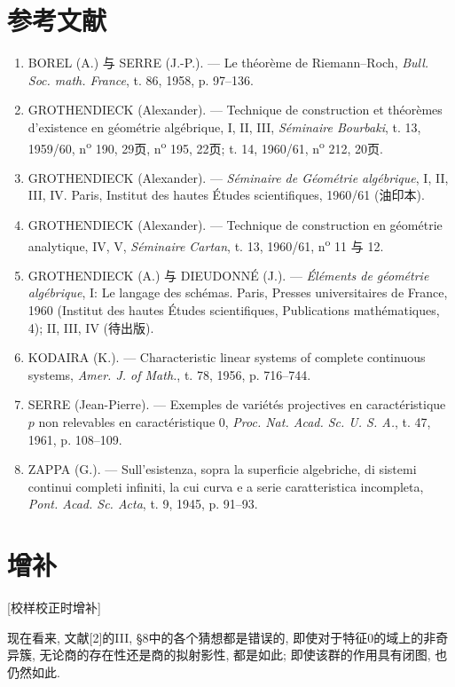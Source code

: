 \section*{参考文献}

\begin{enumerate}
\item[{[1]}]\label{fga3.iv-bib-1} BOREL (A.) 与 SERRE (J.-P.). --- Le théorème de Riemann--Roch, \emph{Bull. Soc. math. France}, t. 86, 1958, p. 97--136.
\item[{[2]}]\label{fga3.iv-bib-2} GROTHENDIECK (Alexander). --- Technique de construction et théorèmes d'existence en géométrie algébrique, I, II, III, \emph{Séminaire Bourbaki}, t. 13, 1959/60, n\textsuperscript{o} 190, 29页, n\textsuperscript{o} 195, 22页; t. 14, 1960/61, n\textsuperscript{o} 212, 20页.
\item[{[3]}]\label{fga3.iv-bib-3} GROTHENDIECK (Alexander). --- \emph{Séminaire de Géométrie algébrique}, I, II, III, IV. Paris, Institut des hautes Études scientifiques, 1960/61 (油印本).
\item[{[4]}]\label{fga3.iv-bib-4} GROTHENDIECK (Alexander). --- Technique de construction en géométrie analytique, IV, V, \emph{Séminaire Cartan}, t. 13, 1960/61, n\textsuperscript{o} 11 与 12.
\item[{[5]}]\label{fga3.iv-bib-5} GROTHENDIECK (A.) 与 DIEUDONNÉ (J.). --- \emph{Éléments de géométrie algébrique}, I: Le langage des schémas. Paris, Presses universitaires de France, 1960 (Institut des hautes Études scientifiques, Publications mathématiques, 4); II, III, IV (待出版).
\item[{[6]}]\label{fga3.iv-bib-6} KODAIRA (K.). --- Characteristic linear systems of complete continuous systems, \emph{Amer. J. of Math.}, t. 78, 1956, p. 716--744.
\item[{[7]}]\label{fga3.iv-bib-7} SERRE (Jean-Pierre). --- Exemples de variétés projectives en caractéristique \(p\) non relevables en caractéristique \(0\), \emph{Proc. Nat. Acad. Sc. U. S. A.}, t. 47, 1961, p. 108--109.
\item[{[8]}]\label{fga3.iv-bib-8} ZAPPA (G.). --- Sull'esistenza, sopra la superficie algebriche, di sistemi continui completi infiniti, la cui curva e a serie caratteristica incompleta, \emph{Pont. Acad. Sc. Acta}, t. 9, 1945, p. 91--93.

\end{enumerate}

\section*{增补}
\label{fga3.iv-additif}

\begin{center}[校样校正时增补]
\end{center}

\par{}现在看来, 文献[2]的III, §8中的各个猜想都是错误的, 即使对于特征\(0\)的域上的非奇异簇, 无论商的存在性还是商的拟射影性, 都是如此; 即使该群的作用具有闭图, 也仍然如此.
